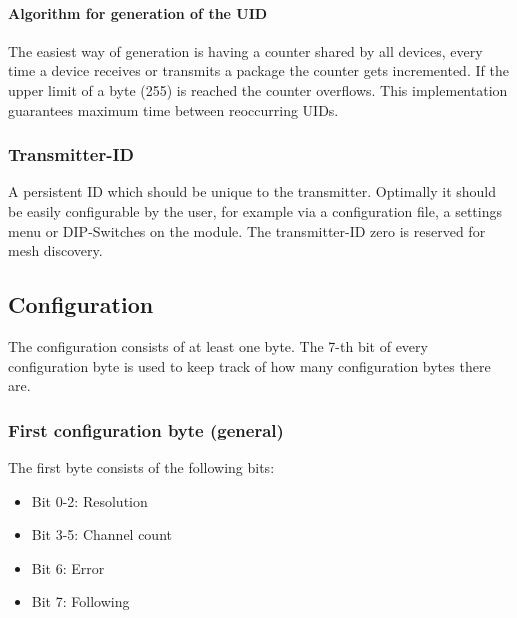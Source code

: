 \documentclass{scrreprt}
\begin{document}
\paragraph{Algorithm for generation of the UID}
 The easiest way of generation is having a counter shared by all devices,
 every time a device receives or transmits a package the counter gets
 incremented. If the upper limit of a byte (255) is reached the counter
 overflows. This implementation guarantees maximum time between reoccurring
 UIDs.

\subsubsection{Transmitter-ID}
 A persistent ID which should be unique to the transmitter. Optimally it
 should be easily configurable by the user, for example via a configuration
 file, a settings menu or DIP-Switches on the module. The transmitter-ID zero
 is reserved for mesh discovery.

\subsection{Configuration}
The configuration consists of at least one byte. The 7-th bit  of every configuration byte is used to keep track of how many configuration bytes there are.

\subsubsection{First configuration byte (general)}
The first byte consists of the following bits:
\begin{itemize}
 \item Bit 0-2: Resolution
 \item Bit 3-5: Channel count
 \item Bit 6: Error
 \item Bit 7: Following
\end{itemize}
\end{document}
